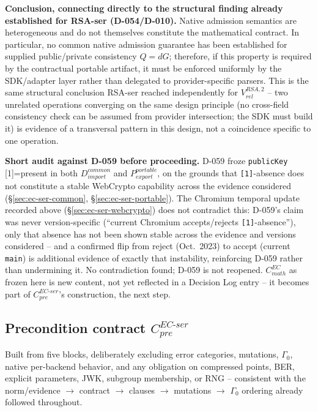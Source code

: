\documentclass[11pt,a4paper]{article}
\begin{document}
\textbf{Conclusion, connecting directly to the structural finding already established for RSA-ser (D-054/D-010).} Native admission semantics are heterogeneous and do not themselves constitute the mathematical contract. In particular, no common native admission guarantee has been established for supplied public/private consistency $Q=dG$; therefore, if this property is required by the contractual portable artifact, it must be enforced uniformly by the SDK/adapter layer rather than delegated to provider-specific parsers. This is the same structural conclusion RSA-ser reached independently for $V_{rel}^{RSA,2}$ -- two unrelated operations converging on the same design principle (no cross-field consistency check can be assumed from provider intersection; the SDK must build it) is evidence of a transversal pattern in this design, not a coincidence specific to one operation.

\textbf{Short audit against D-059 before proceeding.} D-059 froze \texttt{publicKey}\,[1]=present in both $D_{import}^{common}$ and $P_{export}^{portable}$, on the grounds that \texttt{[1]}-absence does not constitute a stable WebCrypto capability across the evidence considered (\S\ref{sec:ec-ser-common}, \S\ref{sec:ec-ser-portable}). The Chromium temporal update recorded above (\S\ref{sec:ec-ser-webcrypto}) does not contradict this: D-059's claim was never version-specific (``current Chromium accepts/rejects \texttt{[1]}-absence''), only that absence has not been shown stable across the evidence and versions considered -- and a confirmed flip from reject (Oct.\ 2023) to accept (current \texttt{main}) is additional evidence of exactly that instability, reinforcing D-059 rather than undermining it. No contradiction found; D-059 is not reopened. $C_{math}^{EC}$ as frozen here is new content, not yet reflected in a Decision Log entry -- it becomes part of $C_{pre}^{EC\text{-}ser}$'s construction, the next step.

\subsection{Precondition contract \texorpdfstring{$C_{pre}^{EC\text{-}ser}$}{C\_pre EC-ser}}\label{sec:ec-ser-cpre}

Built from five blocks, deliberately excluding error categories, mutations, $\Gamma_0$, native per-backend behavior, and any obligation on compressed points, BER, explicit parameters, JWK, subgroup membership, or RNG -- consistent with the norm/evidence $\to$ contract $\to$ clauses $\to$ mutations $\to$ $\Gamma_0$ ordering already followed throughout.
\end{document}
